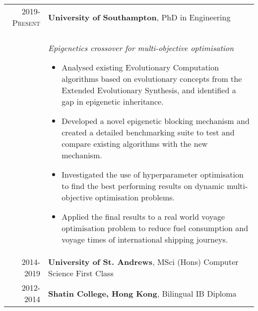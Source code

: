 \documentclass{article}
\begin{document}
\begin{tabular}{r|p{13.5cm}}
\textsc{2019-Present} & \textbf{University of Southampton}, PhD in Engineering
\\
& \\
& \textit{Epigenetics crossover for multi-objective optimisation}


    \begin{itemize}
        \item Analysed existing Evolutionary Computation algorithms
    based on evolutionary concepts from the Extended Evolutionary Synthesis, and 
    identified a gap in epigenetic inheritance.
    \item Developed a novel epigenetic blocking mechanism and created a detailed benchmarking 
    suite to test and compare existing algorithms with the new mechanism.
    \item Investigated the use of hyperparameter optimisation to find the best 
    performing results on dynamic multi-objective optimisation problems.
    \item Applied the final results to a real world voyage optimisation
    problem to reduce fuel consumption and voyage times of international shipping journeys.
    \end{itemize}
\\
\textsc{2014-2019} & \textbf{University of St. Andrews}, MSci (Hons) Computer Science First Class
\\
\textsc{2012-2014} & \textbf{Shatin College, Hong Kong}, Bilingual IB Diploma
\end{tabular}
\end{document}
